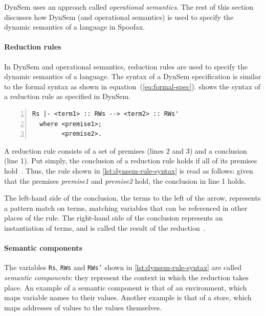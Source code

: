 DynSem uses an approach called \textit{operational semantics}. The rest of this
section discusses how DynSem (and operational semantics) is used to specify the
dynamic semantics of a language in Spoofax.

\paragraph{Reduction rules} In DynSem and operational semantics, reduction rules
are used to specify the dynamic semantics of a language. The syntax of a DynSem
specification is similar to the formal syntax as shown in
equation~(\ref{eq:formal-spec}).  shows the syntax
of a reduction rule as specified in DynSem.

\begin{minipage}[t]{\linewidth}
\begin{lstlisting}[language=dynsem,numbers=left,caption={The syntactic structure
of a reduction rule in DynSem.},label={lst:dynsem-rule-syntax}]
  Rs |- <term1> :: RWs --> <term2> :: RWs'
  where <premise1>;
        <premise2>.
\end{lstlisting}
\end{minipage}

A reduction rule consists of a set of premises (lines 2 and 3) and a conclusion
(line 1). Put simply, the conclusion of a reduction rule holds if all of its
premises hold~\cite{Kahn87}. Thus, the rule shown in
\cref{lst:dynsem-rule-syntax} is read as follows: given that the premises
\textit{premise1} and \textit{premise2} hold, the conclusion in line 1 holds.

The left-hand side of the conclusion, the terms to the left of the arrow,
represents a pattern match on terms, matching variables that can be referenced
in other places of the rule. The right-hand side of the conclusion represents an
instantiation of terms, and is called the result of the
reduction~\cite{VerguNV15}.

\paragraph{Semantic components} The variables \texttt{Rs}, \texttt{RWs} and
\texttt{RWs'} shown in \cref{lst:dynsem-rule-syntax} are called \textit{semantic
  components}: they represent the context in which the reduction takes place. An
example of a semantic component is that of an environment, which maps variable
names to their values. Another example is that of a store, which maps addresses
of values to the values themselves.

